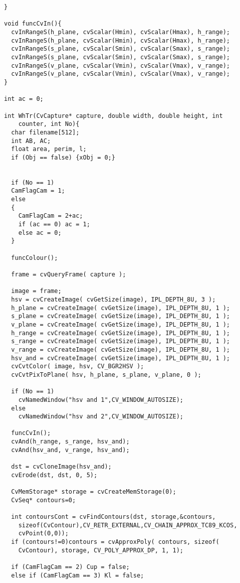 \begin{lstlisting}
}

void funcCvIn(){
  cvInRangeS(h_plane, cvScalar(Hmin), cvScalar(Hmax), h_range);
  cvInRangeS(h_plane, cvScalar(Hmin), cvScalar(Hmax), h_range);
  cvInRangeS(s_plane, cvScalar(Smin), cvScalar(Smax), s_range);
  cvInRangeS(s_plane, cvScalar(Smin), cvScalar(Smax), s_range);
  cvInRangeS(v_plane, cvScalar(Vmin), cvScalar(Vmax), v_range);
  cvInRangeS(v_plane, cvScalar(Vmin), cvScalar(Vmax), v_range);
}

int ac = 0;

int WhTr(CvCapture* capture, double width, double height, int 
	counter, int No){
  char filename[512];
  int AB, AC;
  float area, perim, l;
  if (Obj == false) {xObj = 0;}


  if (No == 1)
  CamFlagCam = 1;
  else
  {
    CamFlagCam = 2+ac;
    if (ac == 0) ac = 1;
    else ac = 0;
  }

  funcColour();

  frame = cvQueryFrame( capture );
    
  image = frame;
  hsv = cvCreateImage( cvGetSize(image), IPL_DEPTH_8U, 3 );
  h_plane = cvCreateImage( cvGetSize(image), IPL_DEPTH_8U, 1 );
  s_plane = cvCreateImage( cvGetSize(image), IPL_DEPTH_8U, 1 );
  v_plane = cvCreateImage( cvGetSize(image), IPL_DEPTH_8U, 1 );
  h_range = cvCreateImage( cvGetSize(image), IPL_DEPTH_8U, 1 );
  s_range = cvCreateImage( cvGetSize(image), IPL_DEPTH_8U, 1 );
  v_range = cvCreateImage( cvGetSize(image), IPL_DEPTH_8U, 1 );
  hsv_and = cvCreateImage( cvGetSize(image), IPL_DEPTH_8U, 1 );
  cvCvtColor( image, hsv, CV_BGR2HSV ); 
  cvCvtPixToPlane( hsv, h_plane, s_plane, v_plane, 0 );
  
  if (No == 1)
    cvNamedWindow("hsv and 1",CV_WINDOW_AUTOSIZE);
  else
    cvNamedWindow("hsv and 2",CV_WINDOW_AUTOSIZE);

  funcCvIn();
  cvAnd(h_range, s_range, hsv_and);
  cvAnd(hsv_and, v_range, hsv_and);

  dst = cvCloneImage(hsv_and);
  cvErode(dst, dst, 0, 5);

  CvMemStorage* storage = cvCreateMemStorage(0);
  CvSeq* contours=0;

  int contoursCont = cvFindContours(dst, storage,&contours,
  	sizeof(CvContour),CV_RETR_EXTERNAL,CV_CHAIN_APPROX_TC89_KCOS,
  	cvPoint(0,0));
  if (contours!=0)contours = cvApproxPoly( contours, sizeof(
  	CvContour), storage, CV_POLY_APPROX_DP, 1, 1);

  if (CamFlagCam == 2) Cup = false;
  else if (CamFlagCam == 3) Kl = false;
    


\end{lstlisting}
